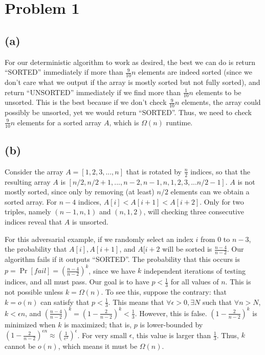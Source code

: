 \documentclass{6046}
\author{Matthew Feng}
\begin{document}
\section*{Problem 1}
\subsection*{(a)}
For our deterministic algorithm to work as desired,
the best we can do is return
``SORTED'' immediately if more than $\frac{9}{10}n$ elements
are indeed sorted (since we don't care what we output
if the array is mostly sorted but not fully sorted),
and return ``UNSORTED'' immediately if
we find more than $\frac{1}{10}n$ elements to be unsorted.
This is the best because if we don't check $\frac{9}{10}n$
elements, the array could possibly be unsorted, yet
we would return ``SORTED''. Thus, we need to check
$\frac{9}{10}n$ elements for a sorted array $A$, which
is $\Omega(n)$ runtime.

\subsection*{(b)}
Consider the array $A = [1, 2, 3, ..., n]$ that is rotated by
$\frac{n}{2}$ indices, so that the resulting array $A$ is
$[n/2, n/2 + 1, ..., n - 2, n - 1, n, 1, 2, 3, ... n/2 - 1]$.
$A$ is not mostly sorted, since only by removing (at least) 
$n/2$ elements can we obtain a sorted array. For $n - 4$
indices, $A[i] < A[i + 1] < A[i + 2]$. Only for
two triples, namely $(n - 1, n, 1)$ and $(n, 1, 2)$,
will checking three consecutive indices reveal that
$A$ is unsorted.

For this adversarial example, if we randomly select an index
$i$ from $0$ to $n - 3$, the probability that $A[i], A[i + 1]$,
and $A[i + 2$ will be sorted is $\frac{n - 4}{n - 2}$. Our algorithm
fails if it outputs ``SORTED''. The probability that this occurs
is $p = \Pr[fail] = (\frac{n - 4}{n - 2})^k$, since we have $k$ independent
iterations of testing indices, and all must pass.
Our goal is to have $p < \frac{1}{3}$ for all values of $n$. This
is not possible unless $k = \Omega(n)$. To see this, suppose
the contrary: that $k = o(n)$ can satisfy that $p < \frac{1}{3}$.
This means that $\forall \epsilon > 0, \exists N$
such that $\forall n > N$, $k < \epsilon n$, and
$(\frac{n - 4}{n - 2})^k = (1 - \frac{2}{n - 2})^k < \frac{1}{3}$.
However, this is false. $(1 - \frac{2}{n - 2})^k$ is minimized when
$k$ is maximized; that is, $p$ is lower-bounded by
$(1 - \frac{2}{n - 2})^{\epsilon n} \approx (\frac{1}{e^2})^\epsilon$.
For very small $\epsilon$, this value is larger than $\frac{1}{3}$.
Thus, $k$ cannot be $o(n)$, which means it must be $\Omega(n)$.
\end{document}
